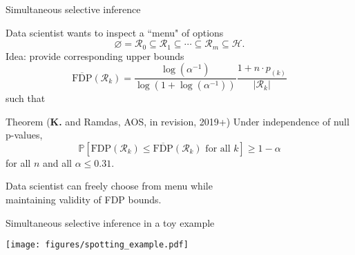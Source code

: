 \documentclass{beamer}
\begin{document}
\begin{frame}{Simultaneous selective inference}
		
	Data scientist wants to inspect a ``menu" of options 
	\begin{equation*}
	\varnothing = \mathcal R_0 \subseteq \mathcal R_1 \subseteq \cdots \subseteq \mathcal R_m \subseteq \mathcal H.
	\end{equation*}
	Idea: provide corresponding upper bounds 
	\begin{equation*}
	\overline{\text{FDP}}(\mathcal R_k) = \frac{\log(\alpha^{-1})}{\log(1+\log(\alpha^{-1}))}\frac{1 + n \cdot p_{(k)}}{|\mathcal R_k|}
	\end{equation*}
	such that
	\begin{block}{Theorem (\textbf{K.} and Ramdas, AOS, in revision, 2019+)}
	Under independence of null p-values,
	\begin{equation*}
	\mathbb P[\text{FDP}(\mathcal R_k) \leq \overline{\text{FDP}}(\mathcal R_k) \text{ for all } k] \geq 1-\alpha
	\end{equation*}
	for all $n$ and all $\alpha \leq 0.31$.
	\end{block}

	Data scientist can freely choose from menu while \\ maintaining validity of FDP bounds.

\end{frame}

\begin{frame}{Simultaneous selective inference in a toy example}
	

	\begin{center}
		\texttt{[image: figures/spotting\_example.pdf]}
	\end{center}
	
\end{frame}
\end{document}
